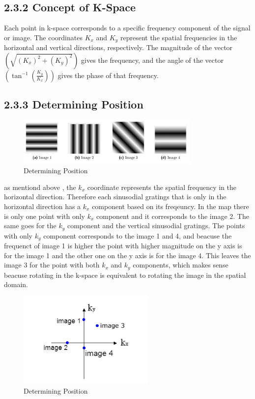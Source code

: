 \documentclass[12pt,fleqn]{article}
\begin{document}
\subsection{2.3.2 Concept of K-Space}
Each point in k-space corresponds to a specific frequency component of the signal or image. The coordinates $K_x$ and $K_y$  represent the spatial frequencies in the horizontal and vertical directions, respectively. The magnitude of the vector $(\sqrt{(K_x)^2 + (K_y)^2})$ gives the frequency, and the angle of the vector $(\tan^{-1}(\frac{K_y}{K_x}))$ gives the phase of that frequency.
\subsection{2.3.3 Determining Position}
\begin{figure}[H]
    \centering
    \includegraphics[width=0.8\textwidth]{sinusodial_gratings.png}
    \caption{Determining Position}
    \label{fig:2.3.3}
\end{figure}
as mentiond above , the $k_x$ coordinate represents the spatial frequency in the horizontal direction. Therefore each sinusodial gratings that is only in the horizontal direction has a $k_x$ component based on its freqeuncy. In the map there is only one point with only $k_x$ component and it corresponds to the image 2.
The same goes for the $k_y$ component and the vertical sinusodial gratings. The points with only $k_y$ component corresponds to the image 1 and 4, and beacuse the frequenct of image 1 is higher the point with higher magnitude on the y axis is for the image 1 and the other one on the y axis is for the image 4. This leaves the image 3 for the point with both $k_x$ and $k_y$ components, which makes sense beacuse rotating in the k-space is equivalent to rotating the image in the spatial domain.
\begin{figure}[H]
    \centering
    \includegraphics[width=0.6\textwidth]{k_space.png}
    \caption{Determining Position}
    \label{fig:2.3.3}
\end{figure}
\end{document}
